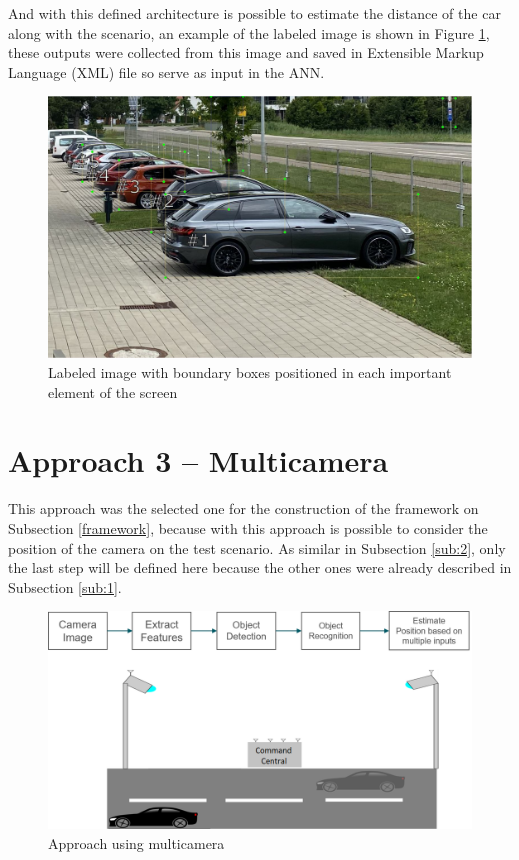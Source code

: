 And with this defined architecture is possible to estimate the distance of the car along with the scenario, an example of the labeled image is shown in Figure \ref{fig:boundary_boxes_car}, these outputs were collected from this image and saved in Extensible Markup Language (XML) file so serve as input in the ANN. 


\begin{figure}[H]
\centering
\includegraphics[width=\textwidth]{imagens/boundary_boxes.JPG}
\caption{Labeled image with boundary boxes positioned in each important element of the screen}
\label{fig:boundary_boxes_car}
\end{figure}




\section{Approach 3 – Multicamera}\label{sub:3}

This approach was the selected one for the construction of the framework on Subsection \ref{framework}, because with this approach is possible to consider the position of the camera on the test scenario. As similar in Subsection \ref{sub:2}, only the last step will be defined here because the other ones were already described in Subsection \ref{sub:1}. 


\begin{figure}[H]
\centering
\includegraphics[width=\textwidth]{imagens/proposal3.png}
\caption{Approach using multicamera}
\label{fig:proposal3}
\end{figure}

